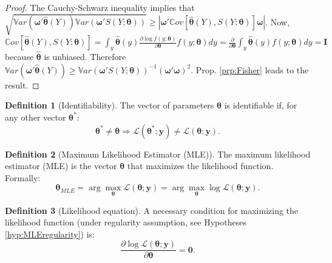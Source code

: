 \documentclass[
  12pt,
]{book}
\theoremstyle{definition}
\newtheorem{definition}{Definition}[chapter]
\theoremstyle{definition}
\theoremstyle{definition}
\theoremstyle{definition}
\theoremstyle{remark}
\begin{document}
\begin{proof}
The Cauchy-Schwarz inequality implies that \(\sqrt{\mathbb{V}ar(\boldsymbol\omega'\hat{\boldsymbol\theta}(Y))\mathbb{V}ar(\boldsymbol\omega'S(Y;\boldsymbol\theta))} \ge |\boldsymbol\omega'\mathbb{C}ov[\hat{\boldsymbol\theta}(Y),S(Y;\boldsymbol\theta)]\boldsymbol\omega |\). Now, \(\mathbb{C}ov[\hat{\boldsymbol\theta}(Y),S(Y;\boldsymbol\theta)] = \int_y \hat{\boldsymbol\theta}(y) \frac{\partial \log f(y;\boldsymbol\theta)}{\partial \boldsymbol\theta} f(y;\boldsymbol\theta)dy = \frac{\partial}{\partial \boldsymbol\theta}\int_y \hat{\boldsymbol\theta}(y) f(y;\boldsymbol\theta)dy = \mathbf{I}\) because \(\hat{\boldsymbol\theta}\) is unbiased. Therefore \(\mathbb{V}ar(\boldsymbol\omega'\hat{\boldsymbol\theta}(Y)) \ge \mathbb{V}ar(\boldsymbol\omega'S(Y;\boldsymbol\theta))^{-1} (\boldsymbol\omega'\boldsymbol\omega)^2\). Prop. \ref{prp:Fisher} leads to the result.
\end{proof}

\begin{definition}[Identifiability]
\protect\hypertarget{def:identif}{}\label{def:identif}The vector of parameters \(\boldsymbol\theta\) is identifiable if, for any other vector \(\boldsymbol\theta^*\):
\[
\boldsymbol\theta^* \ne \boldsymbol\theta \Rightarrow \mathcal{L}(\boldsymbol\theta^*;\mathbf{y}) \ne \mathcal{L}(\boldsymbol\theta;\mathbf{y}).
\]
\end{definition}

\begin{definition}[Maximum Likelihood Estimator (MLE)]
\protect\hypertarget{def:MLEest}{}\label{def:MLEest}The maximum likelihood estimator (MLE) is the vector \(\boldsymbol\theta\) that maximizes the likelihood function. Formally:
\begin{equation}
\boldsymbol\theta_{MLE} = \arg \max_{\boldsymbol\theta} \mathcal{L}(\boldsymbol\theta;\mathbf{y})  = \arg \max_{\boldsymbol\theta} \log \mathcal{L}(\boldsymbol\theta;\mathbf{y}).\label{eq:MLEestimator}
\end{equation}
\end{definition}

\begin{definition}[Likelihood equation]
\protect\hypertarget{def:likFunction}{}\label{def:likFunction}A necessary condition for maximizing the likelihood function (under regularity assumption, see Hypotheses \ref{hyp:MLEregularity}) is:
\begin{equation}
\dfrac{\partial \log \mathcal{L}(\boldsymbol\theta;\mathbf{y})}{\partial \boldsymbol\theta} = \mathbf{0}.
\end{equation}
\end{definition}
\end{document}
